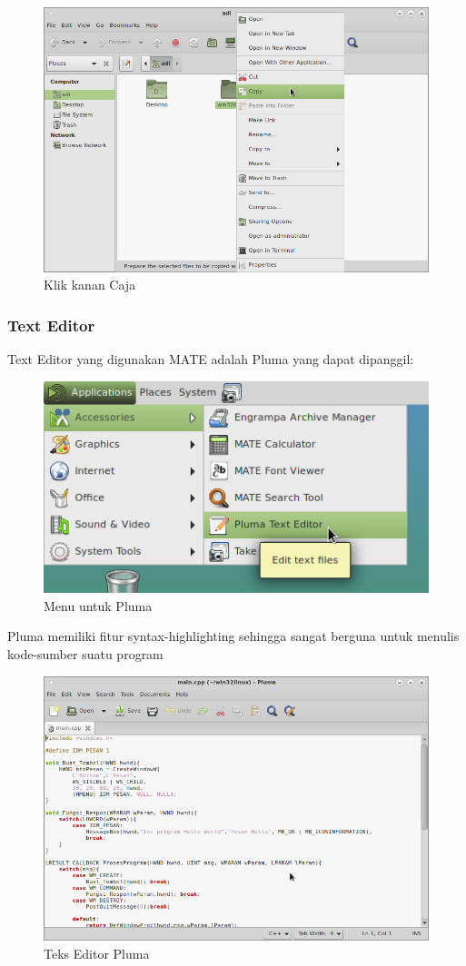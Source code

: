 \documentclass[12pt,]{article}
\begin{document}
	\begin{figure}[H]
		\centering
		\includegraphics[width=0.8\linewidth]{images/mateapp/caja4}
		\caption{Klik kanan Caja}
	\end{figure}

	\newpage
	\subsubsection{Text Editor}
	Text Editor yang digunakan MATE adalah Pluma yang dapat dipanggil:
	\begin{figure}[H]
		\centering
		\includegraphics[width=0.5\linewidth]{images/mateapp/pluma1}
		\caption{Menu untuk Pluma}
	\end{figure}
	Pluma memiliki fitur syntax-highlighting sehingga sangat berguna untuk menulis kode-sumber suatu program
	\begin{figure}[H]
		\centering
		\includegraphics[width=0.8\linewidth]{images/mateapp/pluma2}
		\caption{Teks Editor Pluma}
	\end{figure}
\end{document}

